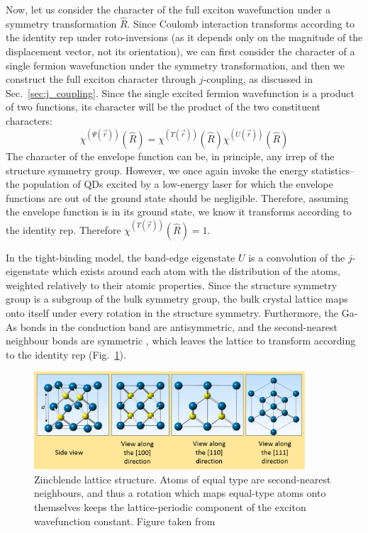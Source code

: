 Now, let us consider the character of the full exciton wavefunction under a symmetry transformation $\hat{R}$. Since Coulomb interaction transforms according to the identity rep under roto-inversions (as it depends only on the magnitude of the displacement vector, not its orientation), we can first consider the character of a single fermion wavefunction under the symmetry transformation, and then we construct the full exciton character through $j$-coupling, as discussed in Sec.~\ref{sec:j_coupling}. Since the single excited fermion wavefunction is a product of two functions, its character will be the product of the two constituent characters:
\begin{equation} \label{eq:character_breakdown}
\chi^{\left(\Psi\left(\vec{r}\right)\right)}\left(\hat{R}\right)=\chi^{\left(\Upsilon\left(\vec{r}\right)\right)}\left(\hat{R}\right)\chi^{\left(U\left(\vec{r}\right)\right)}\left(\hat{R}\right)
\end{equation}
The character of the envelope function can be, in principle, any irrep of the structure symmetry group. However, we once again invoke the energy statistics--the population of QDs excited by a low-energy laser for which the envelope functions are out of the ground state should be negligible. Therefore, assuming the envelope function is in its ground state, we know it transforms according to the identity rep. Therefore $\chi^{\left(\Upsilon\left(\vec{r}\right)\right)}\left(\hat{R}\right)=1$.

In the tight-binding model, the band-edge eigenstate $U$ is a convolution of the $j$-eigenstate which exists around each atom with the distribution of the atoms, weighted relatively to their atomic properties. Since the structure symmetry group is a subgroup of the bulk symmetry group, the bulk crystal lattice maps onto itself under every rotation in the structure symmetry. Furthermore, the Ga-As bonds in the conduction band are antisymmetric, and the second-nearest neighbour bonds are symmetric \cite{gaas_bonding}, which leaves the lattice to transform according to the identity rep (Fig.~\ref{fig:zincblende_lattice_structure}).

\begin{figure}
\begin{center}
\includegraphics[width=0.9\textwidth]{figures/zincblende_lattice_structure}
\caption{Zincblende lattice structure. Atoms of equal type are second-nearest neighbours, and thus a rotation which maps equal-type atoms onto themselves keeps the lattice-periodic component of the exciton wavefunction constant. Figure taken from \cite[Fig.~2.3]{zincblende_lattice_structure} \label{fig:zincblende_lattice_structure}}
\end{center}
\end{figure}

